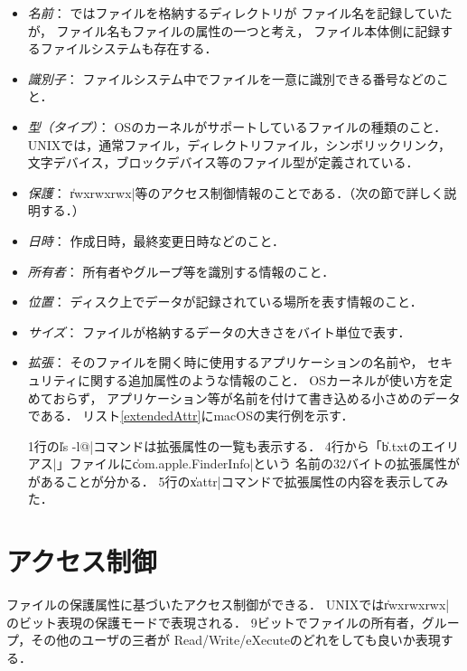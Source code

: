 \begin{itemize}
\item \emph{名前}：
  ではファイルを格納するディレクトリが
  ファイル名を記録していたが，
  ファイル名もファイルの属性の一つと考え，
  ファイル本体側に記録するファイルシステムも存在する．
\item \emph{識別子}：
  ファイルシステム中でファイルを一意に識別できる番号などのこと．
\item \emph{型（タイプ）}：
  OSのカーネルがサポートしているファイルの種類のこと．
  UNIXでは，通常ファイル，ディレクトリファイル，シンボリックリンク，
  文字デバイス，ブロックデバイス等のファイル型が定義されている．
\item \emph{保護}：
  \|rwxrwxrwx|等のアクセス制御情報のことである．（次の節で詳しく説明する．）
\item \emph{日時}：
  作成日時，最終変更日時などのこと．
\item \emph{所有者}：
  所有者やグループ等を識別する情報のこと．
\item \emph{位置}：
  ディスク上でデータが記録されている場所を表す情報のこと．
\item \emph{サイズ}：
  ファイルが格納するデータの大きさをバイト単位で表す．
\item \emph{拡張}：
  そのファイルを開く時に使用するアプリケーションの名前や，
  セキュリティに関する追加属性のような情報のこと．
  OSカーネルが使い方を定めておらず，
  アプリケーション等が名前を付けて書き込める小さめのデータである．
  リスト\ref{extendedAttr}にmacOSの実行例を示す．

  

  1行の\|ls -l@|コマンドは拡張属性の一覧も表示する．
  4行から「\|b.txtのエイリアス|」ファイルに\|com.apple.FinderInfo|という
  名前の32バイトの拡張属性ががあることが分かる．
  5行の\|xattr|コマンドで拡張属性の内容を表示してみた．
\end{itemize}

\section{アクセス制御}
ファイルの保護属性に基づいたアクセス制御ができる．
UNIXでは\|rwxrwxrwx|のビット表現の保護モードで表現される．
9ビットでファイルの所有者，グループ，その他のユーザの三者が
Read/Write/eXecuteのどれをしても良いか表現する．

